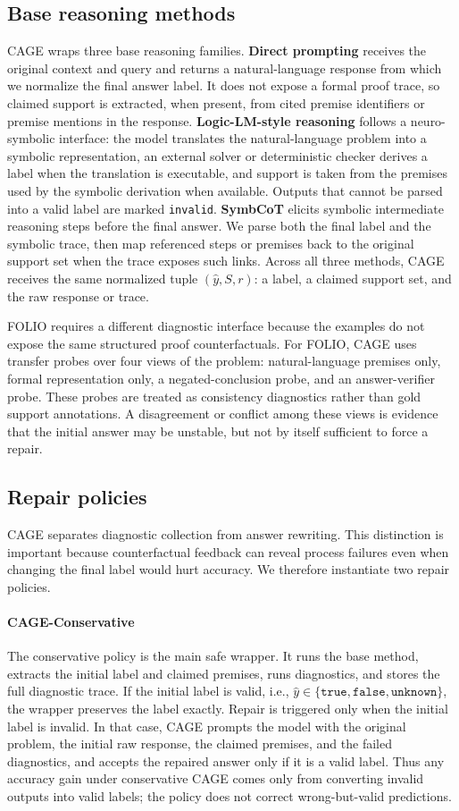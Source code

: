 \documentclass{article}
\begin{document}
\subsection{Base reasoning methods}
CAGE wraps three base reasoning families. \textbf{Direct prompting} receives the original context and query and returns a natural-language response from which we normalize the final answer label. It does not expose a formal proof trace, so claimed support is extracted, when present, from cited premise identifiers or premise mentions in the response. \textbf{Logic-LM-style reasoning} follows a neuro-symbolic interface: the model translates the natural-language problem into a symbolic representation, an external solver or deterministic checker derives a label when the translation is executable, and support is taken from the premises used by the symbolic derivation when available. Outputs that cannot be parsed into a valid label are marked \texttt{invalid}. \textbf{SymbCoT} elicits symbolic intermediate reasoning steps before the final answer. We parse both the final label and the symbolic trace, then map referenced steps or premises back to the original support set when the trace exposes such links. Across all three methods, CAGE receives the same normalized tuple $(\hat{y},S,r)$: a label, a claimed support set, and the raw response or trace.

FOLIO requires a different diagnostic interface because the examples do not expose the same structured proof counterfactuals. For FOLIO, CAGE uses transfer probes over four views of the problem: natural-language premises only, formal representation only, a negated-conclusion probe, and an answer-verifier probe. These probes are treated as consistency diagnostics rather than gold support annotations. A disagreement or conflict among these views is evidence that the initial answer may be unstable, but not by itself sufficient to force a repair.
\subsection{Repair policies}
CAGE separates diagnostic collection from answer rewriting. This distinction is important because counterfactual feedback can reveal process failures even when changing the final label would hurt accuracy. We therefore instantiate two repair policies.
\paragraph{CAGE-Conservative}
The conservative policy is the main safe wrapper. It runs the base method, extracts the initial label and claimed premises, runs diagnostics, and stores the full diagnostic trace. If the initial label is valid, i.e., $\hat{y}\in\{\texttt{true},\texttt{false},\texttt{unknown}\}$, the wrapper preserves the label exactly. Repair is triggered only when the initial label is invalid. In that case, CAGE prompts the model with the original problem, the initial raw response, the claimed premises, and the failed diagnostics, and accepts the repaired answer only if it is a valid label. Thus any accuracy gain under conservative CAGE comes only from converting invalid outputs into valid labels; the policy does not correct wrong-but-valid predictions.
\end{document}
